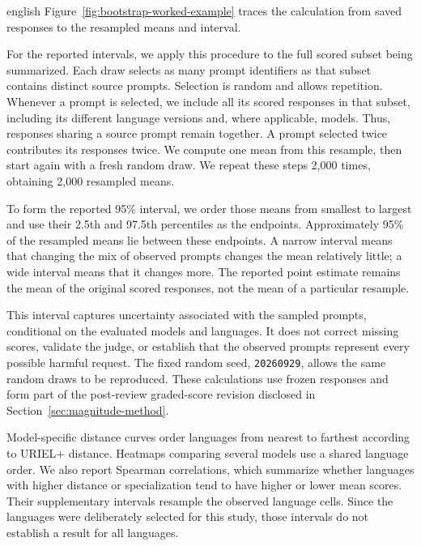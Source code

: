 \begin{otherlanguage*}{english}
Figure~\ref{fig:bootstrap-worked-example} traces the calculation from saved responses to the resampled means and interval.




For the reported intervals, we apply this procedure to the full scored subset being summarized. Each draw selects as many prompt identifiers as that subset contains distinct source prompts. Selection is random and allows repetition. Whenever a prompt is selected, we include all its scored responses in that subset, including its different language versions and, where applicable, models. Thus, responses sharing a source prompt remain together. A prompt selected twice contributes its responses twice. We compute one mean from this resample, then start again with a fresh random draw. We repeat these steps 2,000 times, obtaining 2,000 resampled means.

To form the reported 95\% interval, we order those means from smallest to largest and use their 2.5th and 97.5th percentiles as the endpoints. Approximately 95\% of the resampled means lie between these endpoints. A narrow interval means that changing the mix of observed prompts changes the mean relatively little; a wide interval means that it changes more. The reported point estimate remains the mean of the original scored responses, not the mean of a particular resample.

This interval captures uncertainty associated with the sampled prompts, conditional on the evaluated models and languages. It does not correct missing scores, validate the judge, or establish that the observed prompts represent every possible harmful request. The fixed random seed, \texttt{20260929}, allows the same random draws to be reproduced. These calculations use frozen responses and form part of the post-review graded-score revision disclosed in Section~\ref{sec:magnitude-method}.


Model-specific distance curves order languages from nearest to farthest according to URIEL+ distance. Heatmaps comparing several models use a shared language order. We also report Spearman correlations, which summarize whether languages with higher distance or specialization tend to have higher or lower mean scores. Their supplementary intervals resample the observed language cells. Since the languages were deliberately selected for this study, those intervals do not establish a result for all languages.


\end{otherlanguage*}
